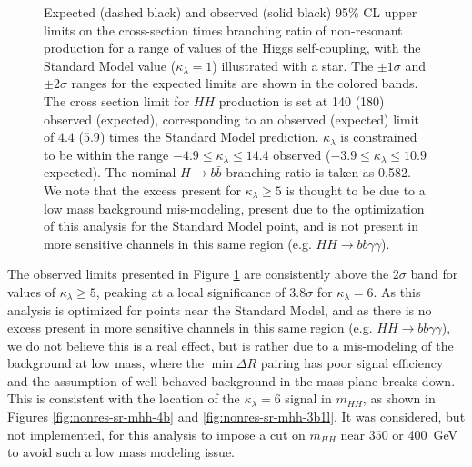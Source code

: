 \begin{figure}[ht]
  \centering
  \caption{\label{fig:nonres-limits}
    Expected (dashed black) and observed (solid black) 95\% CL upper limits on the cross-section times 
    branching ratio of non-resonant production 
    for a range of values of the Higgs self-coupling, with the Standard Model value ($\kappa_{\lambda} = 1$) illustrated 
    with a star. The \(\pm 1\sigma\) and \(\pm 2\sigma\) ranges for the expected limits are shown in the colored bands. 
    The cross section limit for $HH$ production is set at \SI{140}{\fb} (\SI{180}{\fb}) observed (expected), 
    corresponding to an observed (expected) limit of $4.4$ ($5.9$) times the Standard Model prediction. 
    $\kappa_{\lambda}$ is constrained to be within the range $-4.9 \leq \kappa_{\lambda} \leq 14.4$ observed 
    ($-3.9 \leq \kappa_{\lambda} \leq 10.9$ expected). The nominal \(H \rightarrow b\bar{b}\) branching ratio is 
    taken as 0.582. We note that the excess present for $\kappa_{\lambda}\geq 5$ is thought to be due to a low mass 
    background mis-modeling, present due to the optimization of this analysis for the Standard Model point, and is not present in more sensitive channels in this same region (e.g. $HH\rightarrow bb\gamma\gamma$).
  }
\end{figure}

The observed limits presented in Figure \ref{fig:nonres-limits} are consistently above the $2\sigma$ band for values of 
$\kappa_{\lambda} \geq 5$, peaking at a local significance of $3.8\sigma$ for $\kappa_{\lambda} = 6$. 
As this analysis is optimized for points near the Standard Model, and as there is no excess present in more 
sensitive channels in this same region (e.g. $HH\rightarrow bb\gamma\gamma$), we do 
not believe this is a real effect, but is rather due to a mis-modeling of the background at low mass, where 
the $\min{\Delta R}$ pairing 
has poor signal efficiency and the assumption of well behaved background in the mass plane breaks down. This is 
consistent with the location of the $\kappa_{\lambda} = 6$ signal in $m_{HH}$, as shown in Figures \ref{fig:nonres-sr-mhh-4b} and \ref{fig:nonres-sr-mhh-3b1l}.
It was considered, but not implemented, for this analysis to impose a cut on $m_{HH}$ near $350$ or \SI{400}{\GeV} to avoid such a low mass modeling issue.

